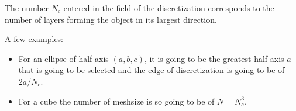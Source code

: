 The number $N_c$ entered in the field of the discretization
corresponds to the number of layers forming the object in its largest
direction.

A few examples:

\begin{itemize} 
\item For an ellipse of half axis $(a,b,c)$, it is going to be the
  greatest half axis $a$ that is going to be selected and the edge of
  discretization is going to be of $2a/N_c$.
\item For a cube the number of meshsize is so going to be of
  $N=N_c^3$.
\end{itemize}
